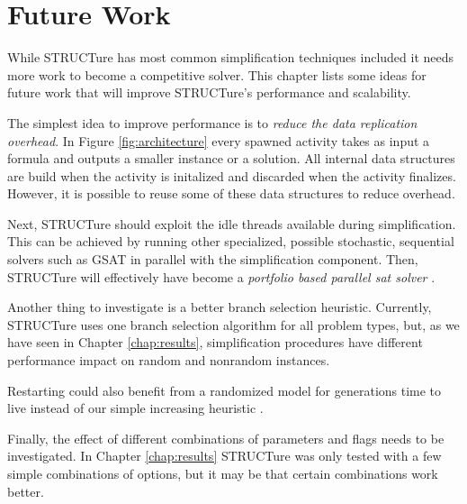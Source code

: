 \chapter{Future Work}
\label{chap:future}

While STRUCTure has most common simplification techniques included
it needs more work to become a competitive solver. This chapter
lists some ideas for future work that will improve STRUCTure's
performance and scalability.

The simplest idea to improve performance is to \emph{reduce the data
replication overhead}. In Figure \ref{fig:architecture} every spawned
activity takes as input a formula and outputs a smaller instance or a
solution. All internal data structures are build when the activity is
initalized and discarded when the activity finalizes. However, it is
possible to reuse some of these data structures to reduce overhead.

Next, STRUCTure should exploit the idle threads available
during simplification. This can be achieved by running other
specialized, possible stochastic, sequential solvers such as GSAT
\cite{Selman92anew} in parallel with the simplification component.
Then, STRUCTure will effectively have become a \emph{portfolio
based parallel sat solver} \cite{5547119}.

Another thing to investigate is a better branch selection heuristic.
Currently, STRUCTure uses one branch selection algorithm for all
problem types, but, as we have seen in Chapter \ref{chap:results},
simplification procedures have different performance impact on
random and nonrandom instances.

Restarting could also benefit from a randomized model for
generations time to live instead of our simple increasing heuristic
\cite{Gomes:1998:BCS:295240.295710}.

Finally, the effect of different combinations of parameters and
flags needs to be investigated. In Chapter \ref{chap:results}
STRUCTure was only tested with a few simple combinations of options,
but it may be that certain combinations work better.
